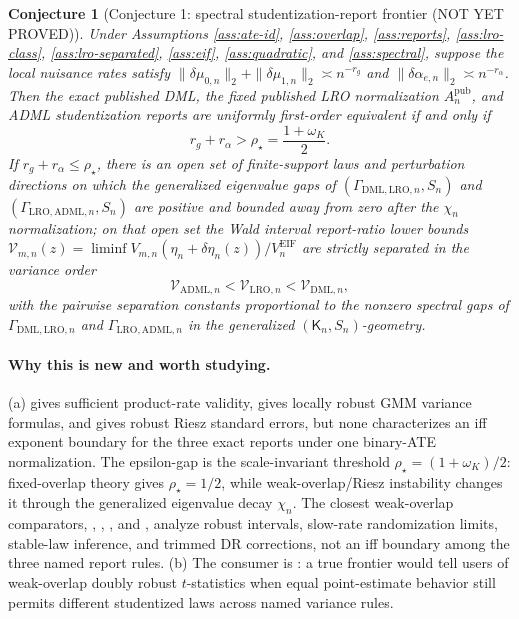 \documentclass[11pt]{article}
\theoremstyle{definition}
\theoremstyle{plain}
\newtheorem{conjecture}{Conjecture}
\theoremstyle{remark}
\begin{document}
\begin{conjecture}[Conjecture 1: spectral studentization-report frontier (NOT YET PROVED)]\label{conj:spectral-frontier}
Under Assumptions \ref{ass:ate-id}, \ref{ass:overlap}, \ref{ass:reports},
\ref{ass:lro-class}, \ref{ass:lro-separated}, \ref{ass:eif},
\ref{ass:quadratic}, and \ref{ass:spectral}, suppose the local
nuisance rates satisfy
\(\|\delta\mu_{0,n}\|_2+\|\delta\mu_{1,n}\|_2\asymp n^{-r_g}\) and
\(\|\delta\alpha_{e,n}\|_2\asymp n^{-r_\alpha}\).  Then the exact published DML,
the fixed published LRO normalization \(A_n^{\mathrm{pub}}\), and ADML
studentization reports are uniformly first-order equivalent if and only if
\[
r_g+r_\alpha>\rho_\star=\frac{1+\omega_K}{2}.
\]
If \(r_g+r_\alpha\le \rho_\star\), there is an open set of finite-support laws
and perturbation directions on which the generalized eigenvalue gaps of
\((\Gamma_{\mathrm{DML},\mathrm{LRO},n},S_n)\) and
\((\Gamma_{\mathrm{LRO},\mathrm{ADML},n},S_n)\) are positive and bounded away
from zero after the \(\chi_n\) normalization; on that open set the Wald
interval report-ratio lower bounds
\(\mathcal V_{m,n}(z)=\liminf V_{m,n}(\eta_n+\delta\eta_n(z))/V^{\mathrm{EIF}}_n\)
are strictly separated in the variance order
\[
\mathcal V_{\mathrm{ADML},n}
<\mathcal V_{\mathrm{LRO},n}
<\mathcal V_{\mathrm{DML},n},
\]
with the pairwise separation constants proportional to the nonzero spectral
gaps of
\(\Gamma_{\mathrm{DML},\mathrm{LRO},n}\) and
\(\Gamma_{\mathrm{LRO},\mathrm{ADML},n}\) in the generalized
\((\mathsf K_n,S_n)\)-geometry.
\end{conjecture}
\paragraph{Why this is new and worth studying.}
(a) \citet{ChernozhukovEtAl2018ECTJ} gives sufficient product-rate validity,
\citet{ChernozhukovEscancianoIchimuraNeweyRobins2022LRO} gives locally robust
GMM variance formulas, and \citet{ChernozhukovNeweySingh2022ADML} gives robust
Riesz standard errors, but none characterizes an iff exponent boundary for the
three exact reports under one binary-ATE normalization.  The epsilon-gap is
the scale-invariant threshold \(\rho_\star=(1+\omega_K)/2\): fixed-overlap
theory gives \(\rho_\star=1/2\), while weak-overlap/Riesz instability changes
it through the generalized eigenvalue decay \(\chi_n\).  The closest
weak-overlap comparators, \citet{Rothe2017LimitedOverlapCI},
\citet{HongLeungLi2020LimitedOverlap}, \citet{HeilerKazak2021ExtremePS}, and
\citet{MaSantAnnaSasakiUra2026WeakOverlapDR}, analyze robust intervals,
slow-rate randomization limits, stable-law inference, and trimmed DR
corrections, not an iff boundary among the three named report rules.  (b) The
consumer is \citet{Dorn2025WeakOverlapDR}: a true frontier would tell users of
weak-overlap doubly robust \(t\)-statistics when equal point-estimate behavior
still permits different studentized laws across named variance rules.
\end{document}

